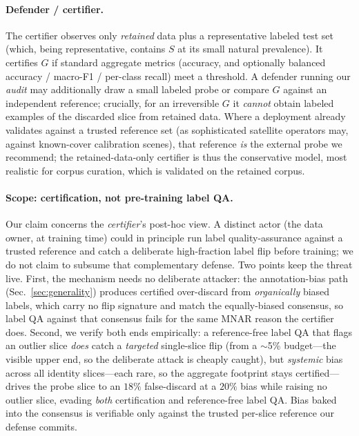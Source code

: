 \documentclass[conference]{IEEEtran}
\begin{document}
\paragraph{Defender / certifier.} The certifier observes only \emph{retained} data plus a representative
labeled test set (which, being representative, contains $S$ at its small natural prevalence). It certifies
$G$ if standard aggregate metrics (accuracy, and optionally balanced accuracy / macro-F1 / per-class recall)
meet a threshold. A defender running our \emph{audit} may additionally draw a small labeled probe or compare
$G$ against an independent reference; crucially, for an irreversible $G$ it \emph{cannot} obtain labeled
examples of the discarded slice from retained data. Where a deployment already validates against a trusted
reference set (as sophisticated satellite operators may, against known-cover calibration scenes), that reference
\emph{is} the external probe we recommend; the retained-data-only certifier is thus the conservative model, most
realistic for corpus curation, which is validated on the retained corpus.

\paragraph{Scope: certification, not pre-training label QA.} Our claim concerns the \emph{certifier}'s post-hoc
view. A distinct actor (the data owner, at training time) could in principle run label quality-assurance against
a trusted reference and catch a deliberate high-fraction label flip before training; we do not claim to subsume
that complementary defense. Two points keep the threat live. First, the mechanism needs no deliberate attacker:
the annotation-bias path (Sec.~\ref{sec:generality}) produces certified over-discard from \emph{organically}
biased labels, which carry no flip signature and match the equally-biased consensus, so label QA against that
consensus fails for the same MNAR reason the certifier does. Second, we verify both ends empirically: a reference-free label QA that flags an outlier slice \emph{does} catch a
\emph{targeted} single-slice flip (from a $\sim$5\% budget---the visible upper end, so the deliberate attack is
cheaply caught), but \emph{systemic} bias across all identity slices---each rare, so the aggregate footprint stays
certified---drives the probe slice to an $18\%$ false-discard at a $20\%$ bias while raising no outlier slice,
evading \emph{both} certification and reference-free label QA. Bias baked into the consensus is verifiable only
against the trusted per-slice reference our defense commits.
\end{document}
